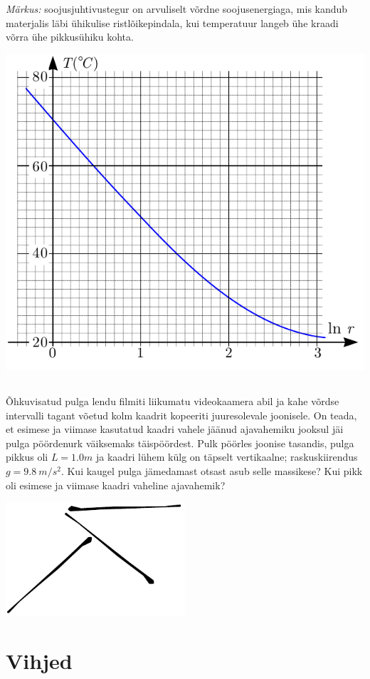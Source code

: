 \documentclass[10pt]{article}
\begin{document}
\textit{Märkus:} soojusjuhtivustegur on arvuliselt võrdne soojusenergiaga, mis kandub materjalis läbi ühikulise ristlõikepindala, kui temperatuur langeb ühe kraadi võrra ühe pikkusühiku kohta.
\begin{center}
	\includegraphics[width = 0.7\linewidth]{2018-lahg-09-yl.pdf}
\end{center}
\probend
\bigskip
\newpage\subsection{\protect{}}


Õhkuvisatud pulga lendu filmiti liikumatu videokaamera abil ja kahe võrdse intervalli tagant võetud kolm kaadrit kopeeriti juuresolevale joonisele. On teada, et esimese ja viimase kasutatud kaadri vahele jäänud ajavahemiku jooksul jäi pulga pöördenurk väiksemaks täispöördest. Pulk pöörles joonise tasandis, pulga pikkus oli $L=\SI{1.0}m$ ja kaadri lühem külg on täpselt vertikaalne; raskuskiirendus $g=\SI{9.8}{m/s^2}$. Kui kaugel pulga jämedamast otsast asub selle massikese? Kui pikk oli esimese ja viimase kaadri vaheline ajavahemik?
\begin{center}
	\includegraphics[width = 0.5\textwidth]{2018-lahg-10-yl.pdf}
\end{center}
\probend
\bigskip
\newpage\normalsize\section{Vihjed}
        \toggleHint
        
\end{document}
